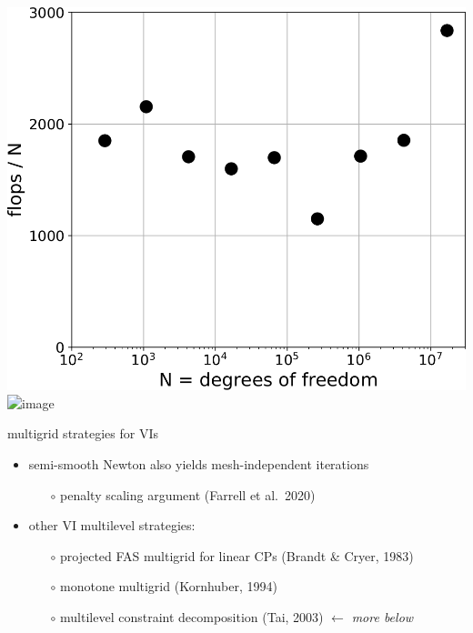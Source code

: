 \documentclass[svgnames,
               hyperref={colorlinks,citecolor=DeepPink4,linkcolor=FireBrick,urlcolor=Maroon},
               usepdftitle=false]  %
               {beamer}
\begin{document}
\begin{frame}[fragile]
\vspace{-22mm}
\hspace{40mm} \includegraphics[height=0.45\textheight]{images/obstacle-flops-per-n.png} \qquad \includegraphics<2>[width=20mm]{images/frontcover.jpg}
\end{frame}


\begin{frame}{multigrid strategies for VIs}

\begin{itemize}
\item semi-smooth Newton also yields mesh-independent iterations
    \begin{itemize}
    \item[$\circ$] penalty scaling argument (Farrell et al.~2020)
    \end{itemize}
\item other VI multilevel strategies:
    \begin{itemize}
    \item[$\circ$] projected FAS multigrid for linear CPs (Brandt \& Cryer, 1983)
    \item[$\circ$] monotone multigrid (Kornhuber, 1994)
    \item[$\circ$] multilevel constraint decomposition (Tai, 2003)  \hfill $\gets$ \emph{more below}
    \end{itemize}
\end{itemize}
\end{frame}


\newcommand{\stacktwo}[2]{\begin{tabular}{c} #1 \\ #2 \end{tabular}}
\end{document}
